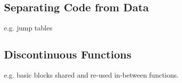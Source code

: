 
\subsection{Separating Code from Data}
\label{sec:separating-code-from-data}

e.g. jump tables




\subsection{Discontinuous Functions}

e.g. basic blocks shared and re-used in-between functions.

%
%
